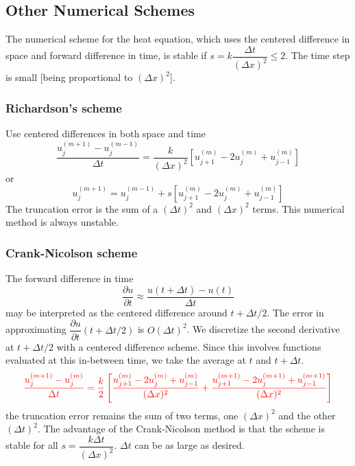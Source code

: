 \documentclass[12pt,a4paper]{article}
\begin{document}
\subsection{Other Numerical Schemes}
The numerical scheme for the heat equation, which uses the centered difference in space and forward difference in time, is stable if $s=k\dfrac{\Delta t}{(\Delta x)^2} \leqslant 2$. The time step is small [being proportional to $(\Delta x)^2$].

\subsubsection{Richardson's scheme}
Use centered differences in both space and time
\begin{equation}
\frac{u_j^{(m+1)} -u_j^{(m-1)} }{\Delta t} = \frac{k}{(\Delta x)^2} \left[u_{j+1}^{(m)} -2u_{j}^{(m)} + u_{j-1}^{(m)}  \right]
\end{equation}
or
\begin{equation}
u_j^{(m+1)} = u_j^{(m-1)} +s\left[u_{j+1}^{(m)} -2u_{j}^{(m)} + u_{j-1}^{(m)}  \right]
\end{equation}
The truncation error is the sum of a $(\Delta t)^2$ and $(\Delta x)^2$ terms. This numerical method is always unstable.

\subsubsection{Crank-Nicolson scheme}
The forward difference in time
\begin{equation*}
\dfrac{\partial u}{\partial t} \approx \frac{u(t+\Delta t) -u(t) }{\Delta t}
\end{equation*}
may be interpreted as the centered difference around $t+\Delta t/2$. The error in approximating $\dfrac{\partial u}{\partial t}(t+\Delta t/2)$ is $O(\Delta t)^2$. We discretize the second derivative at $t+\Delta t/2$ with a centered difference scheme. Since this involves functions evaluated at this in-between time, we take the average at $t$ and $t+\Delta t$.
\begin{equation}
\color{red} \frac{u_j^{(m+1)} -u_j^{(m)} }{\Delta t} = \frac{k}{2} \left[\frac{u_{j+1}^{(m)} -2u_{j}^{(m)} + u_{j-1}^{(m)} }{(\Delta x)^2} + \frac{u_{j+1}^{(m+1)} -2u_{j}^{(m+1)} + u_{j-1}^{(m+1)} }{(\Delta x)^2} \right]
\end{equation}
the truncation error remains the sum of two terms, one $(\Delta x)^2$ and the other $(\Delta t)^2$. The advantage of the Crank-Nicolson method is that the scheme is stable for all $s=\dfrac{k\Delta t}{(\Delta x)^2}$. $\Delta t$ can be as large as desired. 
\end{document}
